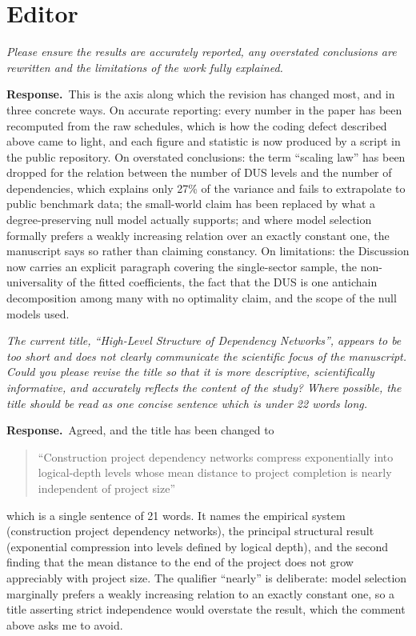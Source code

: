 \documentclass[11pt,a4paper]{article}
\newcommand{\rev}[1]{\medskip\noindent\textit{#1}\par\medskip}
\newcommand{\reply}{\noindent\textbf{Response.}\ }
\begin{document}
\section*{Editor}

\rev{Please ensure the results are accurately reported, any overstated
conclusions are rewritten and the limitations of the work fully explained.}

\reply This is the axis along which the revision has changed most, and in three
concrete ways. On accurate reporting: every number in the paper has been
recomputed from the raw schedules, which is how the coding defect described
above came to light, and each figure and statistic is now produced by a script
in the public repository. On overstated conclusions: the term ``scaling law''
has been dropped for the relation between the number of DUS levels and the
number of dependencies, which explains only 27\% of the variance and fails to
extrapolate to public benchmark data; the small-world claim has been replaced by
what a degree-preserving null model actually supports; and where model selection
formally prefers a weakly increasing relation over an exactly constant one, the
manuscript says so rather than claiming constancy. On limitations: the
Discussion now carries an explicit paragraph covering the single-sector sample,
the non-universality of the fitted coefficients, the fact that the DUS is one
antichain decomposition among many with no optimality claim, and the scope of
the null models used.

\rev{The current title, ``High-Level Structure of Dependency Networks'', appears
to be too short and does not clearly communicate the scientific focus of the
manuscript. Could you please revise the title so that it is more descriptive,
scientifically informative, and accurately reflects the content of the study?
Where possible, the title should be read as one concise sentence which is under
22 words long.}

\reply Agreed, and the title has been changed to

\begin{quote}
``Construction project dependency networks compress exponentially into
logical-depth levels whose mean distance to project completion is nearly
independent of project size''
\end{quote}

which is a single sentence of 21 words. It names the empirical system
(construction project dependency networks), the principal structural result
(exponential compression into levels defined by logical depth), and the second
finding that the mean distance to the end of the project does not grow
appreciably with project size. The qualifier ``nearly'' is deliberate: model
selection marginally prefers a weakly increasing relation to an exactly constant
one, so a title asserting strict independence would overstate the result, which
the comment above asks me to avoid.
\end{document}
